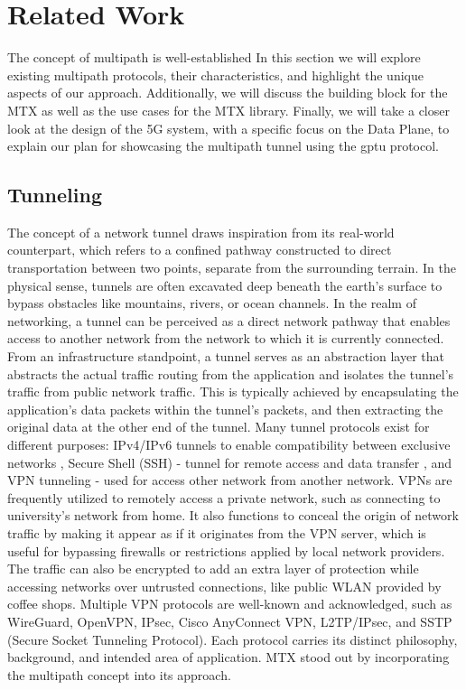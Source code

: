 \cleardoublepage\chapter{Related Work}\label{sec:related_work}\minitoc\vspace{.5cm}

The concept of multipath is well-established
In this section we will explore existing multipath protocols, their characteristics, and highlight the unique aspects of our approach. 
Additionally, we will discuss the building block for the MTX as well as the use cases for the \ac{MTX} library. 
Finally, we will take a closer look at the design of the 5G system, with a specific focus on the Data Plane, to explain our plan for showcasing the multipath tunnel using the \ac{gptu} protocol.

\section{Tunneling}
The concept of a network tunnel draws inspiration from its real-world counterpart, which refers to a confined pathway constructed to direct transportation between two points, separate from the surrounding terrain. 
In the physical sense, tunnels are often excavated deep beneath the earth's surface to bypass obstacles like mountains, rivers, or ocean channels.
In the realm of networking, a tunnel can be perceived as a direct network pathway that enables access to another network from the network to which it is currently connected. 
From an infrastructure standpoint, a tunnel serves as an abstraction layer that abstracts the actual traffic routing from the application and isolates the tunnel's traffic from public network traffic. 
This is typically achieved by encapsulating the application's data packets within the tunnel's packets, and then extracting the original data at the other end of the tunnel.
Many tunnel protocols exist for different purposes: IPv4/IPv6 tunnels to enable compatibility between exclusive networks \cite{rfc4380_Teredo_ipv6_tunnel_udp}, Secure Shell (SSH) - tunnel for remote access and data transfer \cite{rfc4251_ssh_protocol}, and \ac{VPN} tunneling - used for access other network from another network. 
\ac{VPN}s are frequently utilized to remotely access a private network, such as connecting to university's network from home. 
It also functions to conceal the origin of network traffic by making it appear as if it originates from the VPN server, which is useful for bypassing firewalls or restrictions applied by local network providers.
The traffic can also be encrypted to add an extra layer of protection while accessing networks over untrusted connections, like public WLAN provided by coffee shops.
Multiple VPN protocols are well-known and acknowledged, such as WireGuard, OpenVPN, IPsec, Cisco AnyConnect VPN, L2TP/IPsec, and SSTP (Secure Socket Tunneling Protocol). 
Each protocol carries its distinct philosophy, background, and intended area of application. 
MTX stood out by incorporating the multipath concept into its approach.

